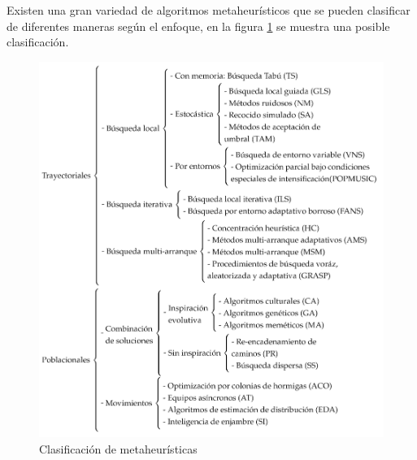 Existen una gran variedad de algoritmos metaheurísticos que se pueden clasificar de diferentes maneras según el enfoque, en la figura \ref{fig:clasif-metahs} se muestra una posible clasificación.

\begin{figure}[H]
	\centering
	\includegraphics[scale=0.84]{Figures/diagrama-meta.pdf}
	\caption{Clasificación de metaheurísticas}
	\label{fig:clasif-metahs}
\end{figure}
